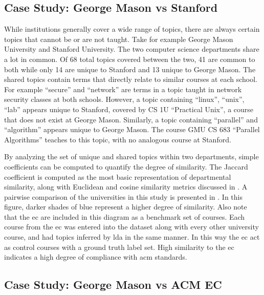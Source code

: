 \subsection{Case Study: George Mason vs Stanford}
\label{sec:eval-comparison-stanford}


While institutions generally cover a wide range of topics, there are always certain topics that cannot be or are not taught.
Take for example George Mason University and Stanford University.
The two computer science departments share a lot in common.
Of 68 total topics covered between the two, 41 are common to both while only 14 are unique to Stanford and 13 unique to George Mason.
The shared topics contain terms that directly relate to similar courses at each school.
For example ``secure'' and ``network'' are terms in a topic taught in network security classes at both schools.
However, a topic containing ``linux'', ``unix'', ``lab'' appears unique to Stanford, covered by CS 1U ``Practical Unix'', a course that does not exist at George Mason.
Similarly, a topic containing ``parallel'' and ``algorithm'' appears unique to George Mason.
The course GMU CS 683 ``Parallel Algorithms'' teaches to this topic, with no analogous course at Stanford.


By analyzing the set of unique and shared topics within two departments, simple coefficients can be computed to quantify the degree of similarity.
The Jaccard coefficient is computed as the most basic representation of departmental similarity, along with Euclidean and cosine similarity metrics discussed in .
A pairwise comparison of the universities in this study is presented in .
In this figure, darker shades of blue represent a higher degree of similarity.
Also note that the \ac{ec} are included in this diagram as a benchmark set of courses.
Each course from the \ac{ec} was entered into the dataset along with every other university course, and had topics inferred by \ac{lda} in the same manner.
In this way the \ac{ec} act as control courses with a ground truth label set.
High similarity to the \ac{ec} indicates a high degree of compliance with \ac{acm} standards.


\subsection{Case Study: George Mason vs ACM EC}
\label{sec:eval-comparison-acmec}

